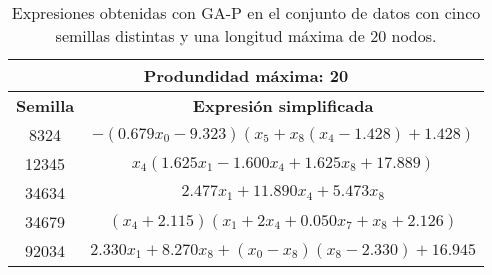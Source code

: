 \begin{table}[H]
\centering
\begin{tabular}{|c|c|}
\hline
\multicolumn{2}{|c|}{\textbf{Produndidad máxima: 20}}                                                                                              \\ \hline
\textbf{Semilla} & \textbf{Expresión simplificada}                                                                                                 \\ \hline
8324             & $- \left(0.679 x_{0} - 9.323\right) \left(x_{5} + x_{8} \left(x_{4} - 1.428\right) + 1.428\right)$ \\ \hline
12345            & $x_{4} \left(1.625 x_{1} - 1.600 x_{4} + 1.625 x_{8} + 17.889\right)$                \\ \hline
34634            & $2.477 x_{1} + 11.890 x_{4} + 5.473 x_{8}$                                                          \\ \hline
34679            & $\left(x_{4} + 2.115\right) \left(x_{1} + 2 x_{4} + 0.050 x_{7} + x_{8} + 2.126\right)$                                 \\ \hline
92034            & $2.330 x_{1} + 8.270 x_{8} + \left(x_{0} - x_{8}\right) \left(x_{8} - 2.330\right) + 16.945$                  \\ \hline
\end{tabular}%
\caption{Expresiones obtenidas con GA-P en el conjunto de datos con cinco semillas distintas y una longitud máxima de 20 nodos.}\label{table:exp_GAP_c_20}
\end{table}




